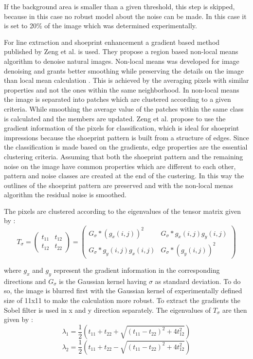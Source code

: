 \documentclass[draft,final]{vutinfth} %
\begin{document}
If the background area is smaller than a given threshold, this step is skipped, because in this case no robust model about the noise can be made.
In this case it is set to 20\% of the image which was determined experimentally.
\par
For line extraction and shoeprint enhancement a gradient based method published by Zeng et al. \cite{zeng2011region} is used.
They propose a region based non-local means algorithm to denoise natural images.
Non-local means was developed for image denoising and grants better smoothing while preserving the details on the image than local mean calculation \cite{buades2005non}.
This is achieved by the averaging pixels with similar properties and not the ones within the same neighborhood.
In non-local means the image is separated into patches which are clustered according to a given criteria.
While smoothing the average value of the patches within the same class is calculated and the members are updated.
Zeng et al. \cite{zeng2011region} propose to use the gradient information of the pixels for classification, which is ideal for shoeprint impressions because the shoeprint pattern is built from a structure of edges.
Since the classification is made based on the gradients, edge properties are the essential clustering criteria.
Assuming that both the shoeprint pattern and the remaining noise on the image have common properties which are different to each other, pattern and noise classes are created at the end of the custering.
In this way the outlines of the shoeprint pattern are preserved and with the non-local menas algorithm the residual noise is smoothed.
\par 
The pixels are clustered according to the eigenvalues of the tensor matrix given by \cite{zeng2011region}:
\[T_\sigma = 
\begin{pmatrix}
t_{11} & t_{12} \\
t_{12} & t_{22}
\end{pmatrix}
=
\begin{pmatrix}
G_\sigma*(g_x(i,j))^2 & G_{\sigma}*g_x(i, j)g_y(i, j)\\
G_{\sigma}*g_y(i, j)g_x(i, j) & G_{\sigma}*(g_y(i, j))^2
\end{pmatrix}
\]

where $g_x$ and $g_y$ represent the gradient information in the corresponding directions and $G_\sigma$ is the Gaussian kernel having $\sigma$ as standard deviation.
To do so, the image is blurred first with the Gaussian kernel of experimentally defined size of 11x11 to make the calculation more robust.
To extract the gradients the Sobel filter is used in x and y direction separately.
The eigenvalues of $T_\sigma$ are then given by \cite{zeng2011region}:
\[\lambda_1 = \frac{1}{2}(t_{11} + t_{22} + \sqrt{(t_{11}-t_{22})^2 + 4t_{12}^2})\]  
\[\lambda_2 = \frac{1}{2}(t_{11} + t_{22} - \sqrt{(t_{11}-t_{22})^2 + 4t_{12}^2})\]  
\label{eig}
\end{document}
